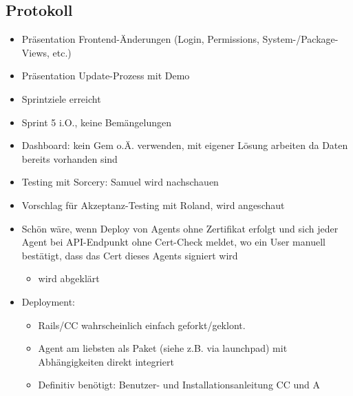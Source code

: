 \documentclass[class=scrbook,crop=false]{standalone}
\begin{document}
    \subsection*{Protokoll}
    
	\begin{itemize}
        \item Präsentation Frontend-Änderungen (Login, Permissions, System-/Package-Views, etc.)
        \item Präsentation Update-Prozess mit Demo
        \item Sprintziele erreicht
        \item Sprint 5 i.O., keine Bemängelungen
        \item Dashboard: kein Gem o.Ä. verwenden, mit eigener Lösung arbeiten da Daten bereits vorhanden sind
        \item Testing mit Sorcery: Samuel wird nachschauen
        \item Vorschlag für Akzeptanz-Testing mit Roland, wird angeschaut
        \item Schön wäre, wenn Deploy von Agents ohne Zertifikat erfolgt und sich jeder Agent bei API-Endpunkt ohne Cert-Check meldet, wo ein User manuell bestätigt, dass das Cert dieses Agents signiert wird
        \begin{itemize}
            \item wird abgeklärt
        \end{itemize}
        \item Deployment:
        \begin{itemize}
            \item Rails/CC wahrscheinlich einfach geforkt/geklont.
            \item Agent am liebsten als Paket (siehe z.B. via launchpad) mit Abhängigkeiten direkt integriert
            \item Definitiv benötigt: Benutzer- und Installationsanleitung CC und A
        \end{itemize}
    \end{itemize}
\end{document}
